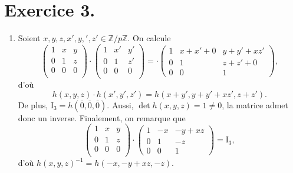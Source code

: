 \documentclass{../../td}
\begin{document}
  \chapter*{Exercice 3.}

  \begin{enumerate}
    \item Soient $x,y,z,x',y,',z' \in \mathds{Z}/p\mathds{Z}$.
      On calcule \[
      \begin{pmatrix}
        1 & x & y\\
        0 & 1 & z\\
        0 & 0 & 0\\
      \end{pmatrix} \cdot 
      \begin{pmatrix}
        1 & x' & y'\\
        0 & 1 & z'\\
        0 & 0 & 0\\
      \end{pmatrix} =\cdot 
      \begin{pmatrix}
        1 & x + x' + 0 & y + y' + x z'\\
        0 & 1 & z + z' + 0\\
        0 & 0 & 1
      \end{pmatrix} 
      ,\]
      d'où \[
        h(x,y,z) \cdot  h(x',y',z') = h(x+y', y+y'+xz', z+z')
      .\]
      De plus, $\mathrm{I}_3 = h(\bar0,\bar0,\bar0)$.
      Aussi, $\det h(x,y,z) = 1 \neq 0$, la matrice admet donc un inverse.
      Finalement, on remarque que \[
      \begin{pmatrix}
        1 & x & y\\
        0 & 1 & z\\
        0 & 0 & 0\\
      \end{pmatrix} \cdot 
      \begin{pmatrix}
        1 & -x & - y + xz \\
        0 & 1 & - z \\
        0 & 0 & 1
      \end{pmatrix} = \mathrm{I}_3
      ,\]
      d'où $h(x,y,z)^{-1} = h(-x, -y + xz, -z)$.


\end{enumerate}
\end{document}
